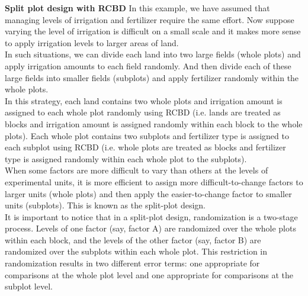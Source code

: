 \documentclass{homework}
\begin{document}
\textbf{Split plot design with RCBD} In this example, we have assumed that managing levels of irrigation and fertilizer require the same effort. Now suppose varying the level of irrigation is difficult on a small scale and it makes more sense to apply irrigation levels to larger areas of land. \\

In such situations, we can divide each land into two large fields (whole plots) and apply irrigation amounts to each field randomly. And then divide each of these large fields into smaller fields (subplots) and apply fertilizer randomly within the whole plots. \\

In this strategy, each land contains two whole plots and irrigation amount is assigned to each whole plot randomly using RCBD (i.e. lands are treated as blocks and irrigation amount is assigned randomly within each block to the whole plots). Each whole plot contains two subplots and fertilizer type is assigned to each subplot using RCBD (i.e. whole plots are treated as blocks and fertilizer type is assigned randomly within each whole plot to the subplots).\\

When some factors are more difficult to vary than others at the levels of experimental units, it is more efficient to assign more difficult-to-change factors to larger units (whole plots) and then apply the easier-to-change factor to smaller units (subplots). This is known as the split-plot design. \\

It is important to notice that in a split-plot design, randomization is a two-stage process. Levels of one factor (say, factor A) are randomized over the whole plots within each block, and the levels of the other factor (say, factor B) are randomized over the subplots within each whole plot. This restriction in randomization results in two different error terms: one appropriate for comparisons at the whole plot level and one appropriate for comparisons at the subplot level. \\
\end{document}

